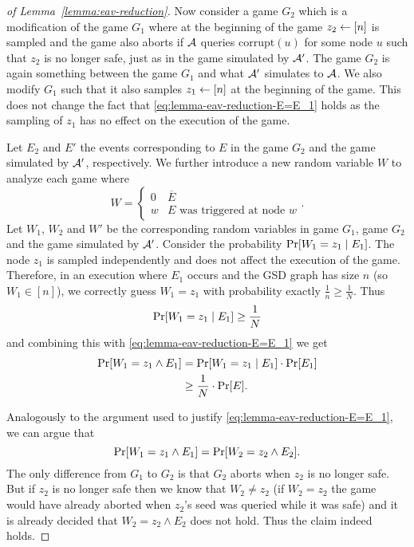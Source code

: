 \begin{proof}[of Lemma~\ref{lemma:eav-reduction}]
	Now consider a game $G_2$ which is a modification of the game $G_1$ where at the beginning of the game $z_2 \leftarrow [n]$ is sampled and the game also aborts if $\mathcal{A}$ queries $\mathrm{corrupt}(u)$ for some node $u$ such that $z_2$ is no longer safe, just as in the game simulated by $\mathcal{A}'$. The game $G_2$ is again something between the game $G_1$ and what $\mathcal{A}'$ simulates to $\mathcal{A}$. We also modify $G_1$ such that it also samples $z_1 \leftarrow [n]$ at the beginning of the game. This does not change the fact that \eqref{eq:lemma-eav-reduction-E=E_1} holds as the sampling of $z_1$ has no effect on the execution of the game.

	Let $E_2$ and $E'$ the events corresponding to $E$ in the game $G_2$ and the game simulated by $\mathcal{A}'$, respectively. We further introduce a new random variable $W$ to analyze each game where
	\[
		W = \begin{cases}
			0 & \overline{E}                       \\
			w & E \text{ was triggered at node } w
		\end{cases}.
	\]
	Let $W_1$, $W_2$ and $W'$ be the corresponding random variables in game $G_1$, game $G_2$ and the game simulated by $\mathcal{A}'$. Consider the probability $\pr{W_1 = z_1 \mid E_1}$. The node $z_1$ is sampled independently and does not affect the execution of the game. Therefore, in an execution where $E_1$ occurs and the GSD graph has size $n$ (so $W_1 \in [n]$), we correctly guess $W_1 = z_1$ with probability exactly $\frac{1}{n} \ge \frac{1}{N}$. Thus
	\[
		\pr{W_1 = z_1 \mid E_1} \ge \frac{1}{N}
	\]
	and combining this with \eqref{eq:lemma-eav-reduction-E=E_1} we get
	\begin{align} \label{eq:lemma-eav-reduction-detect-E1-G1}
		\begin{split}
			\pr{W_1 = z_1 \land E_1} & = \pr{W_1 = z_1 \mid E_1} \cdot \pr{E_1} \\
			& \ge \frac{1}{N} \cdot \pr{E}.
		\end{split}
	\end{align}

	Analogously to the argument used to justify \eqref{eq:lemma-eav-reduction-E=E_1}, we can argue that
	\begin{equation} \label{eq:lemma-eav-reduction-G1-vs-G2}
		\pr{W_1 = z_1 \land E_1} = \pr{W_2 = z_2 \land E_2}.
	\end{equation}
	The only difference from $G_1$ to $G_2$ is that $G_2$ aborts when $z_2$ is no longer safe. But if $z_2$ is no longer safe then we know that $W_2 \neq z_2$ (if $W_2 = z_2$ the game would have already aborted when $z_2$'s seed was queried while it was safe) and it is already decided that $W_2 = z_2 \land E_2$ does not hold. Thus the claim indeed holds.


\end{proof}

